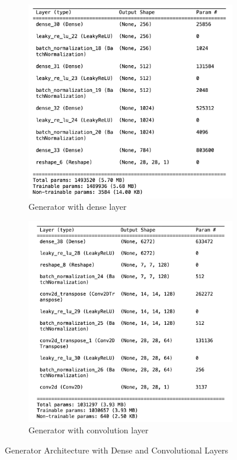 \begin{figure}[H]
    \centering
    \begin{subfigure}[b]{0.45\linewidth}
        \centering
        \includegraphics[width=\linewidth]{./Images/generator_dense.jpg}
        \caption{Generator with dense layer}
        \label{fig:Dense}
    \end{subfigure}
    \hspace{0.05\linewidth}
    \begin{subfigure}[b]{0.45\linewidth}
        \centering
        \includegraphics[width=\linewidth]{./Images/generator_cnn.jpg}
        \caption{Generator with convolution layer}
        \label{fig:Conv2D Transpose}
    \end{subfigure}
    \caption{Generator Architecture with Dense and Convolutional Layers}
    \label{fig:combined}
\end{figure}


